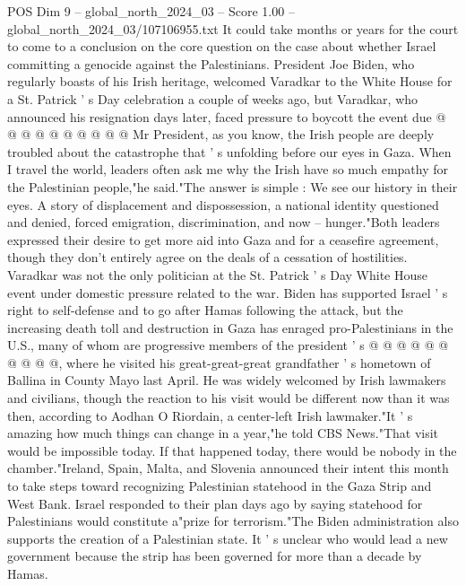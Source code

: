 \begin{textsample}{POS Dim 9 – global\_north\_2024\_03 – Score 1.00 – global\_north\_2024\_03/107106955.txt}
It could take months or years for the court to come to a conclusion on the core question on the case about whether Israel committing a genocide against the Palestinians.
President Joe Biden, who regularly boasts of his Irish heritage, welcomed Varadkar to the White House for a St.
Patrick ' s Day celebration a couple of weeks ago, but Varadkar, who announced his resignation days later, faced pressure to boycott the event due @ @ @ @ @ @ @ @ @ @ Mr President, as you know, the Irish people are deeply troubled about the catastrophe that ' s unfolding before our eyes in Gaza.
When I travel the world, leaders often ask me why the Irish have so much empathy for the Palestinian people,"he said."The answer is simple : We see our history in their eyes.
A story of displacement and dispossession, a national identity questioned and denied, forced emigration, discrimination, and now -- hunger."Both leaders expressed their desire to get more aid into Gaza and for a ceasefire agreement, though they don't entirely agree on the deals of a cessation of hostilities.
Varadkar was not the only politician at the St.
Patrick ' s Day White House event under domestic pressure related to the war.
Biden has supported Israel ' s right to self-defense and to go after Hamas following the attack, but the increasing death toll and destruction in Gaza has enraged pro-Palestinians in the U.S., many of whom are progressive members of the president ' s @ @ @ @ @ @ @ @ @ @, where he visited his great-great-great grandfather ' s hometown of Ballina in County Mayo last April.
He was widely welcomed by Irish lawmakers and civilians, though the reaction to his visit would be different now than it was then, according to Aodhan O Riordain, a center-left Irish lawmaker."It ' s amazing how much things can change in a year,"he told CBS News."That visit would be impossible today.
If that happened today, there would be nobody in the chamber."Ireland, Spain, Malta, and Slovenia announced their intent this month to take steps toward recognizing Palestinian statehood in the Gaza Strip and West Bank.
Israel responded to their plan days ago by saying statehood for Palestinians would constitute a"prize for terrorism."The Biden administration also supports the creation of a Palestinian state.
It ' s unclear who would lead a new government because the strip has been governed for more than a decade by Hamas.

\end{textsample}
